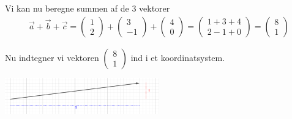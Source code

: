 Vi kan nu beregne summen af de 3 vektorer
\begin{align*}
    \Vec{a} + \Vec{b} + \Vec{c} = \begin{pmatrix} 1 \\ 2 \end{pmatrix} + \begin{pmatrix} 3 \\ -1 \end{pmatrix} + \begin{pmatrix} 4 \\ 0 \end{pmatrix} = \begin{pmatrix}
        1 + 3 + 4 \\ 2 - 1 + 0
    \end{pmatrix}  = \begin{pmatrix}
        8 \\ 1
    \end{pmatrix}
\end{align*}

Nu indtegner vi vektoren $\begin{pmatrix}
    8 \\ 1
\end{pmatrix}$
ind i et koordinatsystem. 

\includegraphics[width = 0.5\textwidth]{Opgave_21-30/Opgave_24/24.2.png}